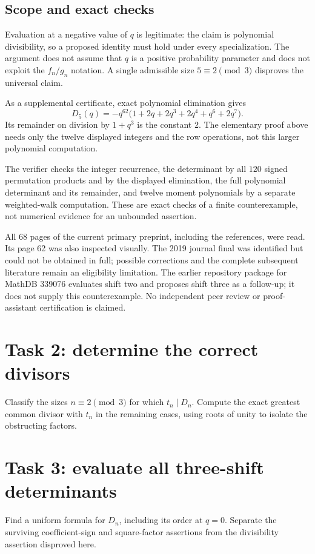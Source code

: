 \documentclass[10pt]{article}
\begin{document}
\subsection*{Scope and exact checks}
Evaluation at a negative value of \(q\) is legitimate: the claim is
polynomial divisibility, so a proposed identity must hold under every
specialization. The argument does not assume that \(q\) is a positive
probability parameter and does not exploit the \(f_n/g_n\) notation.
A single admissible size \(5\equiv2\pmod3\) disproves the universal claim.

As a supplemental certificate, exact polynomial elimination gives
\[
 D_5(q)=-q^{62}
 \bigl(1+2q+2q^3+2q^4+q^6+2q^7\bigr).
\]
Its remainder on division by \(1+q^3\) is the constant \(2\).
The elementary proof above needs only the twelve displayed integers
and the row operations, not this larger polynomial computation.

The verifier checks the integer recurrence, the determinant by all
\(120\) signed permutation products and by the displayed elimination,
the full polynomial determinant and its remainder, and twelve moment
polynomials by a separate weighted-walk computation. These are exact
checks of a finite counterexample, not numerical evidence for an
unbounded assertion.

All 68 pages of the current primary preprint, including the references,
were read. Its page 62 was also inspected visually. The 2019 journal
final \cite{OSfinal} was identified but could not be obtained in full;
possible corrections and the complete subsequent literature remain
an eligibility limitation. The earlier repository package for MathDB
339076 evaluates shift two and proposes shift three as a follow-up;
it does not supply this counterexample.
No independent peer review or proof-assistant certification is claimed.

\section*{Task 2: determine the correct divisors}
Classify the sizes \(n\equiv2\pmod3\) for which \(t_n\mid D_n\).
Compute the exact greatest common divisor with \(t_n\) in the remaining
cases, using roots of unity to isolate the obstructing factors.

\section*{Task 3: evaluate all three-shift determinants}
Find a uniform formula for \(D_n\), including its order at \(q=0\).
Separate the surviving coefficient-sign and square-factor assertions
from the divisibility assertion disproved here.
\end{document}
